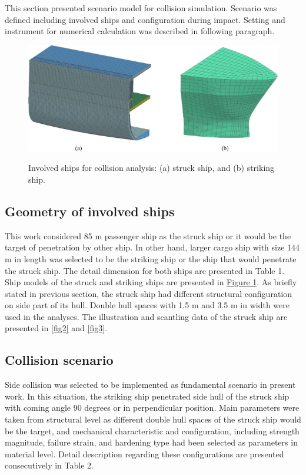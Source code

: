 \documentclass[../Final.tex]{subfiles}
\begin{document}
This section presented scenario model for collision simulation. 
Scenario was defined including involved ships and configuration during impact. Setting and instrument for numerical calculation was described in following paragraph. 

\begin{figure}[h]
    \centering
    \includegraphics[width=\textwidth]{fig1.jpg}
    \label{fig1}
    \caption{Involved ships for collision analysis: (a) struck ship, and (b) striking ship.}
\end{figure}

\subsection{Geometry of involved ships}

This work considered 85 m passenger ship as the struck ship or it would be the target of penetration by other ship. 
In other hand, larger cargo ship with size 144 m in length was selected to be the striking ship or the ship that would penetrate the struck ship. 
The detail dimension for both ships are presented in Table 1. Ship models of the struck and striking ships are presented in \hyperref[fig1]{Figure 1}. 
As briefly stated in previous section, the struck ship had different structural configuration on side part of its hull. Double hull spaces with 1.5 m and 3.5 m in width were used in the analyses. 
The illustration and scantling data of the struck ship are presented in \ref{fig2} and \ref{fig3}. 

\subsection{Collision scenario}

Side collision was selected to be implemented as fundamental scenario in present work. 
In this situation, the striking ship penetrated side hull of the struck ship with coming angle 90 degrees or in perpendicular position. 
Main parameters were taken from structural level as different double hull spaces of the struck ship would be the target, and mechanical character­istic and configuration, including strength magnitude, 
failure strain, and hardening type had been selected as parameters in material level. Detail description regarding these configurations are presented consecutively in Table 2. 
\end{document}
